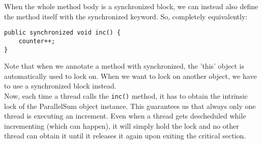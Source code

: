 \documentclass[main.tex]{subfiles}
\begin{document}
When the whole method body is a synchronized block, we can instead also define the method itself with the synchronized keyword. So, completely equivalently:
\begin{verbatim}
public synchronized void inc() {
    counter++;
}
\end{verbatim}
Note that when we annotate a method with synchronized, the 'this' object is automatically used to lock on. When we want to lock on another object, we have to use a synchronized block instead.\\
Now, each time a thread calls the \texttt{inc()} method, it has to obtain the intrinsic lock of the ParallelSum object instance. This guarantees us that always only one thread is executing an increment. Even when a thread gets descheduled while incrementing (which can happen), it will simply hold the lock and no other thread can obtain it until it releases it again upon exiting the critical section.
\end{document}
